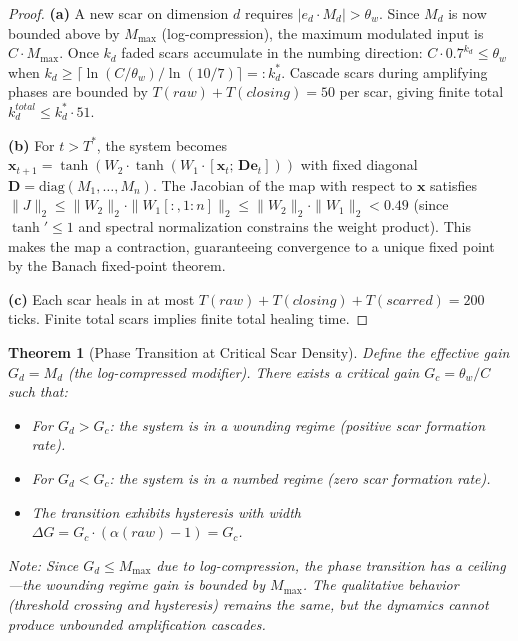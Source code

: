 \documentclass[11pt]{article}
\newtheorem{theorem}{Theorem}[section]
\begin{document}
\begin{proof}
\textbf{(a)} A new scar on dimension $d$ requires $|e_d \cdot M_d| > \theta_w$. Since $M_d$ is now bounded above by $M_{\max}$ (log-compression), the maximum modulated input is $C \cdot M_{\max}$. Once $k_d$ faded scars accumulate in the numbing direction: $C \cdot 0.7^{k_d} \leq \theta_w$ when $k_d \geq \lceil \ln(C/\theta_w) / \ln(10/7) \rceil =: k_d^*$. Cascade scars during amplifying phases are bounded by $T(raw) + T(closing) = 50$ per scar, giving finite total $k_d^{total} \leq k_d^* \cdot 51$.

\textbf{(b)} For $t > T^*$, the system becomes $\mathbf{x}_{t+1} = \tanh(W_2 \cdot \tanh(W_1 \cdot [\mathbf{x}_t;\, \mathbf{D}\mathbf{e}_t]))$ with fixed diagonal $\mathbf{D} = \text{diag}(M_1, \ldots, M_n)$. The Jacobian of the map with respect to $\mathbf{x}$ satisfies $\|J\|_2 \leq \|W_2\|_2 \cdot \|W_1[:, 1{:}n]\|_2 \leq \|W_2\|_2 \cdot \|W_1\|_2 < 0.49$ (since $\tanh' \leq 1$ and spectral normalization constrains the weight product). This makes the map a contraction, guaranteeing convergence to a unique fixed point by the Banach fixed-point theorem.

\textbf{(c)} Each scar heals in at most $T(raw) + T(closing) + T(scarred) = 200$ ticks. Finite total scars implies finite total healing time.
\end{proof}

\begin{theorem}[Phase Transition at Critical Scar Density]
\label{thm:scar-phase}
Define the effective gain $G_d = M_d$ (the log-compressed modifier). There exists a critical gain $G_c = \theta_w / C$ such that:
\begin{itemize}
\item For $G_d > G_c$: the system is in a \emph{wounding regime} (positive scar formation rate).
\item For $G_d < G_c$: the system is in a \emph{numbed regime} (zero scar formation rate).
\item The transition exhibits hysteresis with width $\Delta G = G_c \cdot (\alpha(raw) - 1) = G_c$.
\end{itemize}
Note: Since $G_d \leq M_{\max}$ due to log-compression, the phase transition has a ceiling---the wounding regime gain is bounded by $M_{\max}$. The qualitative behavior (threshold crossing and hysteresis) remains the same, but the dynamics cannot produce unbounded amplification cascades.
\end{theorem}
\end{document}
